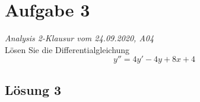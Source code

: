 \documentclass[main.tex]{subfiles}
\begin{document}
\section{Aufgabe 3}
\textit{Analysis 2-Klausur vom 24.09.2020, A04}\\
Lösen Sie die Differentialgleichung
\begin{equation*}
	y'' = 4y' - 4y + 8x + 4
\end{equation*}

\subsection{Lösung 3}
\end{document}
